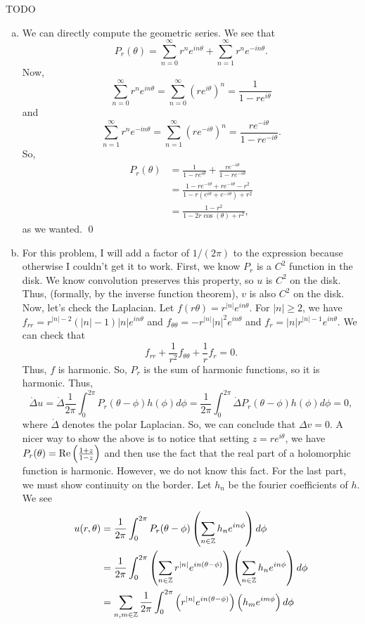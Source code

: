 \documentclass{article}
\begin{document}
\newpage
{} TODO
 \tri
\hop 
\solution
\begin{enumerate}[(a)]
    \item We can directly compute the geometric series. We see that 
    \[P_r(\theta) = \sum_{n=0}^\infty r^n e^{in\theta} + \sum_{n=1}^\infty r^n e^{-in\theta}.\]
    Now,
    \[\sum_{n=0}^\infty r^n e^{in\theta} = \sum_{n=0}^\infty (re^{i\theta})^n = \frac{1}{1-re^{i\theta}}\]
    and
    \[\sum_{n=1}^\infty r^n e^{-in\theta} = \sum_{n=1}^\infty (re^{-i\theta})^n = \frac{re^{-i\theta}}{1-re^{-i\theta}}.\]
    So,
    \begin{align*}
        P_r(\theta) &= \frac{1}{1-re^{i\theta}}+\frac{re^{-i\theta}}{1-re^{-i\theta}} \\
        &= \frac{1-re^{-i\theta}+re^{-i\theta} - r^2}{1-r(e^{i\theta} + e^{-i\theta}) + r^2} \\
        &= \frac{1-r^2}{1-2r\cos(\theta) + r^2},
    \end{align*}
    as we wanted. \qed
    \item For this problem, I will add a factor of $1/(2\pi)$ to the expression because otherwise I couldn't get it to work. First, we know $P_r$ is a $C^2$ function in the disk. We know convolution preserves this property, so $u$ is $C^2$ on the disk. Thus, (formally, by the inverse function theorem), $v$ is also $C^2$ on the disk. 
    \hop Now, let's check the Laplacian. Let $f(r \theta) = r^{|n|}e^{in\theta}$. For $|n| \ge 2$, we have $f_{rr} = r^{|n| - 2}(|n|-1)|n|e^{in\theta}$ and $f_{\theta\theta} = -r^{|n|}|n|^2e^{in\theta}$ and $f_r = |n|r^{|n|-1}e^{in\theta}$. We can check that 
    \[f_{rr}+\frac{1}{r^2}f_{\theta\theta} + \frac{1}{r}f_r = 0.\]
    Thus, $f$ is harmonic. So, $P_r$ is the sum of harmonic functions, so it is harmonic. Thus,
    \[\mathring{\Delta}u = \mathring{\Delta}\frac{1}{2\pi}\int_0^{2\pi} P_r(\theta - \phi)h(\phi)d\phi =\frac{1}{2\pi}\int_0^{2\pi}  \mathring{\Delta} P_r(\theta - \phi)h(\phi)d\phi = 0,\]
    where $\mathring{\Delta}$ denotes the polar Laplacian. So, we can conclude that $\Delta v = 0$.
    \hop 
    A nicer way to show the above is to notice that setting $z = re^{i\theta}$, we have $P_r(\theta) = \text{Re}\del{\frac{1+z}{1-z}}$ and then use the fact that the real part of a holomorphic function is harmonic. However, we do not know this fact.
    \hop 
    For the last part, we must show continuity on the border. Let $h_n$ be the fourier coefficients of $h$. 
    \hop
    We see 
    \begin{align*}
        u(r, \theta) &= \frac{1}{2\pi}\int_0^{2\pi} P_r(\theta-\phi) \del{\sum_{n\in\ZZ}h_ne^{in\phi}}d\phi\\
        &= \frac{1}{2\pi}\int_0^{2\pi} \del{\sum_{n\in\ZZ}r^{|n|}e^{in(\theta - \phi)}} \del{\sum_{n\in\ZZ}h_ne^{in\phi}}d\phi \\
        &= \sum_{n,m\in\ZZ}\frac{1}{2\pi}\int_0^{2\pi} \del{r^{|n|}e^{in(\theta - \phi)}} \del{h_me^{im\phi}}d\phi \\
    \end{align*}
\end{enumerate}
\end{document}
